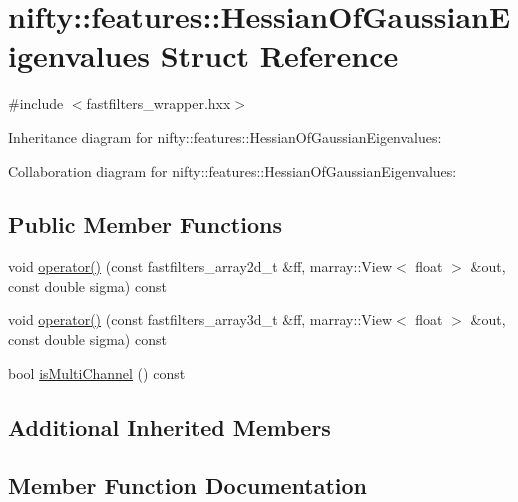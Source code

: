 \hypertarget{structnifty_1_1features_1_1HessianOfGaussianEigenvalues}{}\section{nifty\+:\+:features\+:\+:Hessian\+Of\+Gaussian\+Eigenvalues Struct Reference}
\label{structnifty_1_1features_1_1HessianOfGaussianEigenvalues}


{\ttfamily \#include $<$fastfilters\+\_\+wrapper.\+hxx$>$}



Inheritance diagram for nifty\+:\+:features\+:\+:Hessian\+Of\+Gaussian\+Eigenvalues\+:


Collaboration diagram for nifty\+:\+:features\+:\+:Hessian\+Of\+Gaussian\+Eigenvalues\+:
\subsection*{Public Member Functions}
\begin{DoxyCompactItemize}
\item 
void \hyperlink{structnifty_1_1features_1_1HessianOfGaussianEigenvalues_aceb6fd7d3f60b00eb2463035863cc017}{operator()} (const fastfilters\+\_\+array2d\+\_\+t \&ff, marray\+::\+View$<$ float $>$ \&out, const double sigma) const 
\item 
void \hyperlink{structnifty_1_1features_1_1HessianOfGaussianEigenvalues_a4ec617b8af83d1d43c9bc2d3381319e2}{operator()} (const fastfilters\+\_\+array3d\+\_\+t \&ff, marray\+::\+View$<$ float $>$ \&out, const double sigma) const 
\item 
bool \hyperlink{structnifty_1_1features_1_1HessianOfGaussianEigenvalues_ab107bd91f72c9567346fce3664e1139c}{is\+Multi\+Channel} () const 
\end{DoxyCompactItemize}
\subsection*{Additional Inherited Members}


\subsection{Member Function Documentation}
\hypertarget{structnifty_1_1features_1_1HessianOfGaussianEigenvalues_ab107bd91f72c9567346fce3664e1139c}{}
